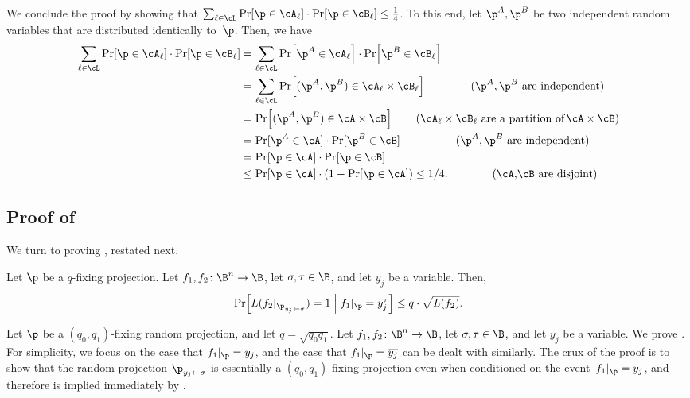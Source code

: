 \documentclass{toc}
\begin{document}
We conclude the proof by showing that $\sum_{\ell\in\cL}\Pr\!\left[\p\in\cA_{\ell}\right]\cdot\Pr\!\left[\p\in\cB_{\ell}\right]\le\frac{1}{4}$.
To this end, let $\p^{A},\p^{B}$ be two independent random variables
that are distributed identically to~$\p$. Then, we have 
\begin{align*}  %
\sum_{\ell\in\cL}\Pr\!\left[\p\in\cA_{\ell}\right]\cdot\Pr\!\left[\p\in\cB_{\ell}\right] & =\sum_{\ell\in\cL}\Pr\!\left[\p^{A}\in\cA_{\ell}\right]\cdot\Pr\!\left[\p^{B}\in\cB_{\ell}\right]\\
 & =\sum_{\ell\in\cL}\Pr\!\left[(\p^{A},\p^{B})\in\cA_{\ell}\times\cB_{\ell}\right] %
\qquad\quad\ \ \ \text{(\ensuremath{\p^{A},\p^{B}} are independent)}\\  %
& =\Pr\!\left[(\p^{A},\p^{B})\in\cA\times\cB\right]
%
\qquad   %
 \text{(\ensuremath{\cA_{\ell}\times\cB_{\ell}} are a partition of\,\ensuremath{\cA\times\cB})}\\    %
 & =\Pr[\p^{A}\in\cA]\cdot\Pr[\p^{B}\in\cB] %
\qquad\qquad\quad \text{(\ensuremath{\p^{A},\p^{B}} are independent)}\\  %
 & =\Pr[\p\in\cA]\cdot\Pr[\p\in\cB]\\
 & \le\Pr[\p\in\cA]\cdot\left(1-\Pr[\p\in\cA]\right) 
%
\le 1/4.  %
%
\qquad\qquad \text{(\ensuremath{\cA},\ensuremath{\cB} are disjoint)}\\   %
\end{align*}
%
%

\subsection{\label{subsec:shrinkage-to-two-literals}Proof of }

We turn to proving , 
restated next.
\begin{restated}{}
Let $\p$ be a $q$-fixing projection. Let $f_{1},f_{2}\colon\B^{n}\to\B$,
let $\sigma,\tau\in\B$, and let $y_{j}$ be a variable. Then, 
\begin{equation}
\Pr\!\left[L(f_{2}|_{\p_{y_{j}\gets\sigma}})=1\;\middle|\;f_{1}|_{\p}=y_{j}^{\tau}\right]\le q\cdot\sqrt{L(f_{2})}.\label{eq:shrinkage-with-conditioning}
\end{equation}
\end{restated}

Let $\p$ be a $(q_{0},q_{1})$-fixing random projection, and let
$q=\sqrt{q_{0}q_{1}}$. Let $f_{1},f_{2}\colon\B^{n}\to\B$, let $\sigma,\tau\in\B$,
and let $y_{j}$ be a variable. We prove .
For simplicity, we focus on the case that $f_{1}|_{\p}=y_{j}$, and
the case that $f_{1}|_{\p}=\overline{y_{j}}$ can be dealt with similarly.
The crux of the proof is to show that the random projection $\p_{y_{j}\gets\sigma}$
is essentially a $(q_{0},q_{1})$-fixing projection even when conditioned
on the event~$f_{1}|_{\p}=y_{j}$, and therefore 
is implied immediately by .
\end{document}
